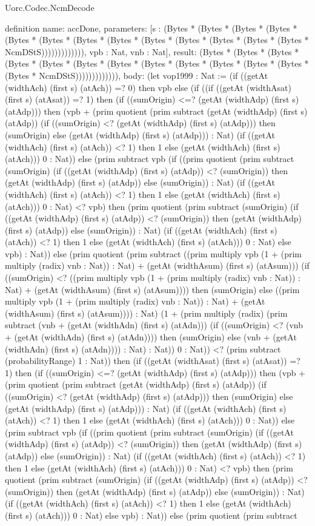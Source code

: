 \begin{lexlean}{Uorc.Codec.NcmDecode}
\begin{semanticmodule}
definition{
  name: accDone,
  parameters: [s : (Bytes * (Bytes * (Bytes * (Bytes * (Bytes * (Bytes * (Bytes * (Bytes * (Bytes * (Bytes * (Bytes * (Bytes * (Bytes * NcmDStS))))))))))))), vpb : Nat, vnb : Nat],
  result: (Bytes * (Bytes * (Bytes * (Bytes * (Bytes * (Bytes * (Bytes * (Bytes * (Bytes * (Bytes * (Bytes * (Bytes * (Bytes * NcmDStS))))))))))))),
  body: (let vop1999 : Nat := (if ((getAt (widthAch) (first s) (atAch)) =? 0) then vpb else (if ((if ((getAt (widthAsat) (first s) (atAsat)) =? 1) then (if ((sumOrigin) <=? (getAt (widthAdp) (first s) (atAdp))) then (vpb + (prim quotient (prim subtract (getAt (widthAdp) (first s) (atAdp)) (if ((sumOrigin) <? (getAt (widthAdp) (first s) (atAdp))) then (sumOrigin) else (getAt (widthAdp) (first s) (atAdp))) : Nat) (if ((getAt (widthAch) (first s) (atAch)) <? 1) then 1 else (getAt (widthAch) (first s) (atAch))) 0 : Nat)) else (prim subtract vpb (if ((prim quotient (prim subtract (sumOrigin) (if ((getAt (widthAdp) (first s) (atAdp)) <? (sumOrigin)) then (getAt (widthAdp) (first s) (atAdp)) else (sumOrigin)) : Nat) (if ((getAt (widthAch) (first s) (atAch)) <? 1) then 1 else (getAt (widthAch) (first s) (atAch))) 0 : Nat) <? vpb) then (prim quotient (prim subtract (sumOrigin) (if ((getAt (widthAdp) (first s) (atAdp)) <? (sumOrigin)) then (getAt (widthAdp) (first s) (atAdp)) else (sumOrigin)) : Nat) (if ((getAt (widthAch) (first s) (atAch)) <? 1) then 1 else (getAt (widthAch) (first s) (atAch))) 0 : Nat) else vpb) : Nat)) else (prim quotient (prim subtract ((prim multiply vpb (1 + (prim multiply (radix) vnb : Nat)) : Nat) + (getAt (widthAsum) (first s) (atAsum))) (if ((sumOrigin) <? ((prim multiply vpb (1 + (prim multiply (radix) vnb : Nat)) : Nat) + (getAt (widthAsum) (first s) (atAsum)))) then (sumOrigin) else ((prim multiply vpb (1 + (prim multiply (radix) vnb : Nat)) : Nat) + (getAt (widthAsum) (first s) (atAsum)))) : Nat) (1 + (prim multiply (radix) (prim subtract (vnb + (getAt (widthAdn) (first s) (atAdn))) (if ((sumOrigin) <? (vnb + (getAt (widthAdn) (first s) (atAdn)))) then (sumOrigin) else (vnb + (getAt (widthAdn) (first s) (atAdn)))) : Nat) : Nat)) 0 : Nat)) <? (prim subtract (probabilityRange) 1 : Nat)) then (if ((getAt (widthAsat) (first s) (atAsat)) =? 1) then (if ((sumOrigin) <=? (getAt (widthAdp) (first s) (atAdp))) then (vpb + (prim quotient (prim subtract (getAt (widthAdp) (first s) (atAdp)) (if ((sumOrigin) <? (getAt (widthAdp) (first s) (atAdp))) then (sumOrigin) else (getAt (widthAdp) (first s) (atAdp))) : Nat) (if ((getAt (widthAch) (first s) (atAch)) <? 1) then 1 else (getAt (widthAch) (first s) (atAch))) 0 : Nat)) else (prim subtract vpb (if ((prim quotient (prim subtract (sumOrigin) (if ((getAt (widthAdp) (first s) (atAdp)) <? (sumOrigin)) then (getAt (widthAdp) (first s) (atAdp)) else (sumOrigin)) : Nat) (if ((getAt (widthAch) (first s) (atAch)) <? 1) then 1 else (getAt (widthAch) (first s) (atAch))) 0 : Nat) <? vpb) then (prim quotient (prim subtract (sumOrigin) (if ((getAt (widthAdp) (first s) (atAdp)) <? (sumOrigin)) then (getAt (widthAdp) (first s) (atAdp)) else (sumOrigin)) : Nat) (if ((getAt (widthAch) (first s) (atAch)) <? 1) then 1 else (getAt (widthAch) (first s) (atAch))) 0 : Nat) else vpb) : Nat)) else (prim quotient (prim subtract }
\end{semanticmodule}
\end{lexlean}
